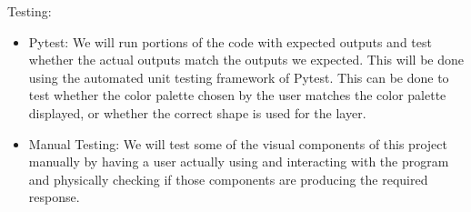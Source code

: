 \documentclass{article}
\begin{document}
Testing:
\begin{itemize}
    \item Pytest: We will run portions of the code with expected outputs and test whether the actual outputs match the outputs we expected. This will be done using the automated unit testing framework of Pytest. This can be done to test whether the color palette chosen by the user matches the color palette displayed, or whether the correct shape is used for the layer.
    \item Manual Testing: We will test some of the visual components of this project manually by having a user actually using and interacting with the program and physically checking if those components are producing the required response.
\end{itemize}
\end{document}

